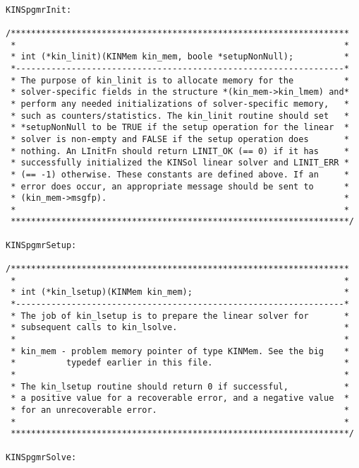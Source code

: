 \documentclass[11pt]{article}
\begin{document}
\begin{verbatim}

KINSpgmrInit:

/*******************************************************************
 *                                                                 *
 * int (*kin_linit)(KINMem kin_mem, boole *setupNonNull);          *
 *-----------------------------------------------------------------*
 * The purpose of kin_linit is to allocate memory for the          *
 * solver-specific fields in the structure *(kin_mem->kin_lmem) and*
 * perform any needed initializations of solver-specific memory,   *
 * such as counters/statistics. The kin_linit routine should set   *
 * *setupNonNull to be TRUE if the setup operation for the linear  *
 * solver is non-empty and FALSE if the setup operation does       *
 * nothing. An LInitFn should return LINIT_OK (== 0) if it has     *
 * successfully initialized the KINSol linear solver and LINIT_ERR *
 * (== -1) otherwise. These constants are defined above. If an     *
 * error does occur, an appropriate message should be sent to      *
 * (kin_mem->msgfp).                                               *
 *                                                                 *
 *******************************************************************/

KINSpgmrSetup:

/*******************************************************************
 *                                                                 *
 * int (*kin_lsetup)(KINMem kin_mem);                              *
 *-----------------------------------------------------------------*
 * The job of kin_lsetup is to prepare the linear solver for       *
 * subsequent calls to kin_lsolve.                                 *
 *                                                                 *
 * kin_mem - problem memory pointer of type KINMem. See the big    *
 *          typedef earlier in this file.                          *
 *                                                                 *
 * The kin_lsetup routine should return 0 if successful,           *
 * a positive value for a recoverable error, and a negative value  *
 * for an unrecoverable error.                                     *
 *                                                                 *
 *******************************************************************/

KINSpgmrSolve:


\end{verbatim}
\end{document}
